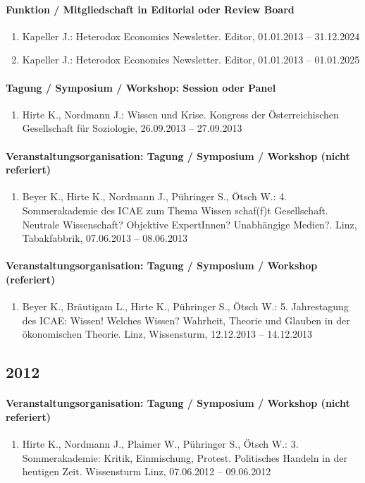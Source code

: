 \paragraph{Funktion / Mitgliedschaft in Editorial oder Review Board}
\begin{enumerate}[leftmargin=*, labelsep=0.5cm]
\item Kapeller J.: Heterodox Economics Newsletter. Editor, 01.01.2013 -- 31.12.2024
\item Kapeller J.: Heterodox Economics Newsletter. Editor, 01.01.2013 -- 01.01.2025
\end{enumerate}
\paragraph{Tagung / Symposium / Workshop: Session oder Panel}
\begin{enumerate}[leftmargin=*, labelsep=0.5cm]
\item Hirte K., Nordmann J.: Wissen und Krise. Kongress der Österreichischen Gesellschaft für Soziologie, 26.09.2013 -- 27.09.2013
\end{enumerate}
\paragraph{Veranstaltungsorganisation: Tagung / Symposium / Workshop (nicht referiert)}
\begin{enumerate}[leftmargin=*, labelsep=0.5cm]
\item Beyer K., Hirte K., Nordmann J., Pühringer S., Ötsch W.: 4. Sommerakademie des ICAE zum Thema  	  Wissen schaf(f)t Gesellschaft. Neutrale Wissenschaft? Objektive ExpertInnen? Unabhängige Medien?. Linz, Tabakfabbrik, 07.06.2013 -- 08.06.2013
\end{enumerate}
\paragraph{Veranstaltungsorganisation: Tagung / Symposium / Workshop (referiert)}
\begin{enumerate}[leftmargin=*, labelsep=0.5cm]
\item Beyer K., Bräutigam L., Hirte K., Pühringer S., Ötsch W.: 5. Jahrestagung des ICAE: Wissen! Welches Wissen? Wahrheit, Theorie und Glauben in der ökonomischen Theorie. Linz, Wissensturm, 12.12.2013 -- 14.12.2013
\end{enumerate}\subsection*{2012}\paragraph{Veranstaltungsorganisation: Tagung / Symposium / Workshop (nicht referiert)}
\begin{enumerate}[leftmargin=*, labelsep=0.5cm]
\item Hirte K., Nordmann J., Plaimer W., Pühringer S., Ötsch W.: 3. Sommerakademie: Kritik, Einmischung, Protest. Politisches Handeln in der heutigen Zeit. Wissensturm Linz, 07.06.2012 -- 09.06.2012
\end{enumerate}
